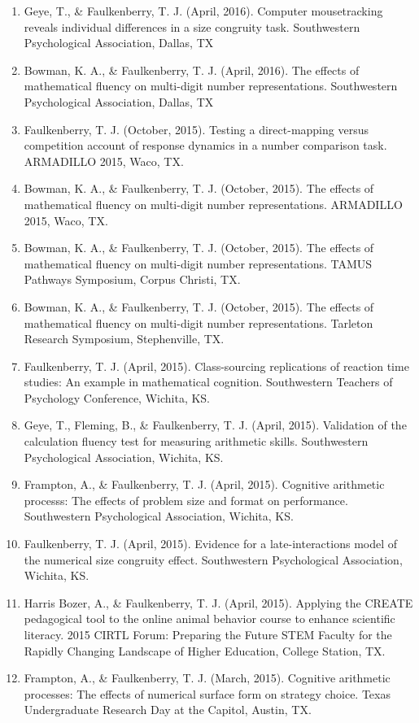 \documentclass[article,10pt]{article}
\begin{document}
\begin{enumerate}
\item Geye, T., \& Faulkenberry, T. J. (April, 2016). Computer mousetracking reveals individual differences in a size congruity task. Southwestern Psychological Association, Dallas, TX
\item Bowman, K. A., \& Faulkenberry, T. J. (April, 2016). The effects of mathematical fluency on multi-digit number representations. Southwestern Psychological Association, Dallas, TX
\item Faulkenberry, T. J. (October, 2015). Testing a direct-mapping versus competition account of response dynamics in a number comparison task. ARMADILLO 2015, Waco, TX.
\item Bowman, K. A., \& Faulkenberry, T. J. (October, 2015). The effects of mathematical fluency on multi-digit number representations. ARMADILLO 2015, Waco, TX.
\item Bowman, K. A., \& Faulkenberry, T. J. (October, 2015). The effects of mathematical fluency on multi-digit number representations. TAMUS Pathways Symposium, Corpus Christi, TX.
\item Bowman, K. A., \& Faulkenberry, T. J. (October, 2015). The effects of mathematical fluency on multi-digit number representations. Tarleton Research Symposium, Stephenville, TX.
\item Faulkenberry, T. J. (April, 2015). Class-sourcing replications of reaction time studies: An example in mathematical cognition. Southwestern Teachers of Psychology Conference, Wichita, KS.
\item Geye, T., Fleming, B., \& Faulkenberry, T. J. (April, 2015). Validation of the calculation fluency test for measuring arithmetic skills. Southwestern Psychological Association, Wichita, KS.
\item Frampton, A., \& Faulkenberry, T. J. (April, 2015). Cognitive arithmetic processs: The effects of problem size and format on performance. Southwestern Psychological Association, Wichita, KS.
\item Faulkenberry, T. J. (April, 2015). Evidence for a late-interactions model of the numerical size congruity effect. Southwestern Psychological Association, Wichita, KS.
\item Harris Bozer, A., \& Faulkenberry, T. J. (April, 2015). Applying the CREATE pedagogical tool to the online animal behavior course to enhance scientific literacy.  2015 CIRTL Forum: Preparing the Future STEM Faculty for the Rapidly Changing Landscape of Higher Education, College Station, TX.
\item Frampton, A., \& Faulkenberry, T. J. (March, 2015). Cognitive arithmetic processes: The effects of numerical surface form on strategy choice. Texas Undergraduate Research Day at the Capitol, Austin, TX.

\end{enumerate}
\end{document}
